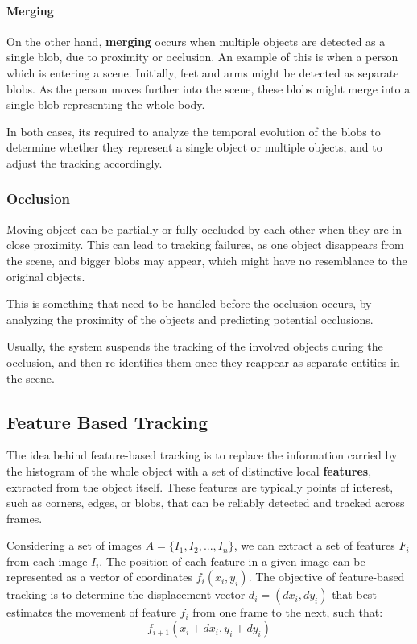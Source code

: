 \paragraph{Merging}
On the other hand, \textbf{merging} occurs when multiple objects are detected as a single blob, due to proximity or occlusion.
An example of this is when a person which is entering a scene. Initially, feet and arms might be detected as separate blobs.
As the person moves further into the scene, these blobs might merge into a single blob representing the whole body.

In both cases, its required to analyze the temporal evolution of the blobs to determine whether they represent a single object or multiple 
objects, and to adjust the tracking accordingly.

\subsubsection{Occlusion}
Moving object can be partially or fully occluded by each other when they are in close proximity.
This can lead to tracking failures, as one object disappears from the scene, and bigger blobs may appear, which
might have no resemblance to the original objects.

This is something that need to be handled before the occlusion occurs, by analyzing the proximity 
of the objects and predicting potential occlusions. 

Usually, the system suspends the tracking of the involved objects during the occlusion, and then re-identifies
them once they reappear as separate entities in the scene.

\subsection{Feature Based Tracking}
The idea behind feature-based tracking is to replace the information carried by the histogram of the whole object 
with a set of distinctive local \textbf{features}, extracted from the object itself.
These features are typically points of interest, such as corners, edges, or blobs, that can be reliably detected and tracked across frames.

Considering a set of images $A = \{I_1, I_2, ..., I_n\}$, we can extract a set of features $F_i$ from each image $I_i$.
The position of each feature in a given image can be represented as a vector of coordinates $f_i(x_i, y_i)$.
The objective of feature-based tracking is to determine the displacement vector $d_i = (dx_i, dy_i)$ that best estimates the movement of
feature $f_i$ from one frame to the next, such that:
\[ f_{i+1}(x_i + dx_i, y_i + dy_i) \]

